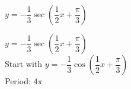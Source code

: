 {$y = -\dfrac{1}{3} \sec \left( \dfrac{1}{2}x + \dfrac{\pi}{3} \right)$}
{$y = -\dfrac{1}{3} \sec \left( \dfrac{1}{2}x + \dfrac{\pi}{3} \right)$\\
Start with $y = -\dfrac{1}{3}\cos \left( \dfrac{1}{2}x + \dfrac{\pi}{3} \right)$\\
Period: $4\pi$

\begin{center}
\end{center}
}
